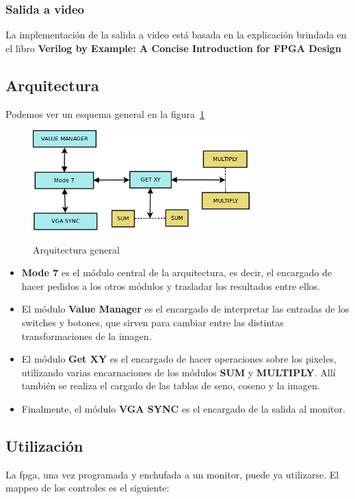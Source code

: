 \subsubsection{Salida a video}
La implementación de la salida a video está basada en la explicación brindada en el libro \textbf{Verilog by Example: A Concise Introduction for FPGA Design}

\subsection{Arquitectura}
Podemos ver un esquema general en la figura~\ref{fig:arquitectura}
\begin{figure}[h!]
 \caption{Arquitectura general}
 \centering
   \includegraphics[width=0.75\textwidth]{arquitectura.png}
   \label{fig:arquitectura}
\end{figure} 

\begin{itemize}
\item \textbf{Mode 7} es el módulo central de la arquitectura, es decir, el encargado de hacer pedidos a los otros módulos y trasladar los resultados entre ellos. 
\item El módulo \textbf{Value Manager} es el encargado de interpretar las entradas de los switches y botones, que sirven para cambiar entre las distintas transformaciones de la imagen.
\item El módulo \textbf{Get XY} es el encargado de hacer operaciones sobre los pixeles, utilizando varias encarnaciones de los módulos \textbf{SUM} y \textbf{MULTIPLY}. Allí también se realiza el cargado de las tablas de seno, coseno y la imagen.
\item Finalmente, el módulo \textbf{VGA SYNC} es el encargado de la salida al monitor.
\end{itemize}

\subsection{Utilización}
La fpga, una vez programada y enchufada a un monitor, puede ya utilizarse. El mappeo de los controles es el siguiente:

